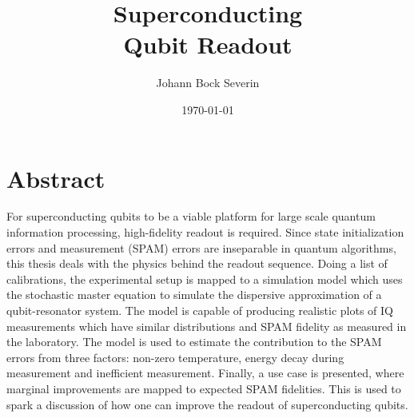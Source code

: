 


\title{Superconducting \\Qubit Readout}
\author{Johann Bock Severin}
\date{\today}


% 
\BgThispage
\maketitlepage

\listoftodos
\chapter*{\centering Abstract}
For superconducting qubits to be a viable platform for large scale quantum information processing, high-fidelity readout is required. Since state initialization errors and measurement (SPAM) errors are inseparable in quantum algorithms, this thesis deals with the physics behind the readout sequence. Doing a list of calibrations, the experimental setup is mapped to a simulation model which uses the stochastic master equation to simulate the dispersive approximation of a qubit-resonator system. The model is capable of producing realistic plots of IQ measurements which have similar distributions and SPAM fidelity as measured in the laboratory. The model is used to estimate the contribution to the SPAM errors from three factors: non-zero temperature, energy decay during measurement and inefficient measurement. Finally, a use case is presented, where marginal improvements are mapped to expected SPAM fidelities. This is used to spark a discussion of how one can improve the readout of superconducting qubits.







